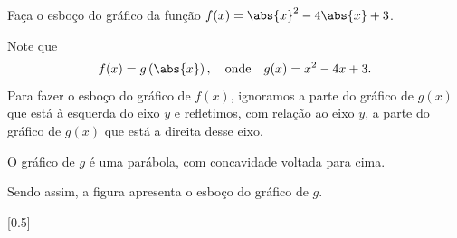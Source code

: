 \begin{example}
  Faça o esboço do gráfico da função
  \(
    f(x) = \abs{x}^2 - 4\abs{x}+3
  \).

  \solution
  Note que
  \[
    f(x) = g\left(\abs{x}\right),
    \quad\text{onde}\quad
    g(x) = x^2 - 4x + 3.
  \]
  Para fazer o esboço do gráfico de $f(x)$, ignoramos a parte do
  gráfico de $g(x)$ que está à esquerda do eixo $y$ e refletimos,
  com relação ao eixo $y$, a parte do gráfico de $g(x)$ que está
  a direita desse eixo.

  O gráfico de $g$ é uma parábola, com concavidade voltada para cima.

  Sendo assim, a figura apresenta o esboço do gráfico de $g$.

  [0.5]
\end{example}
